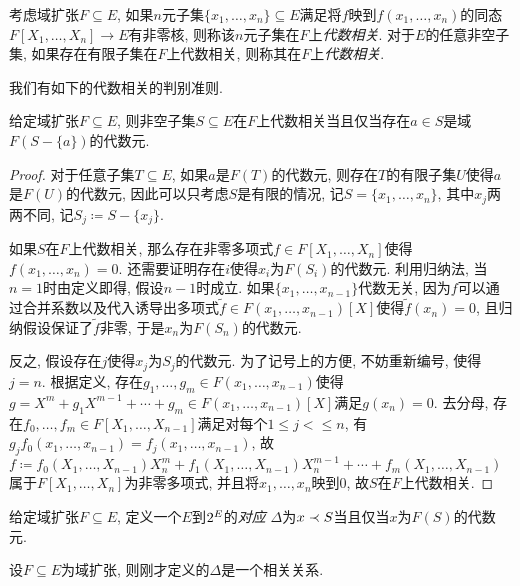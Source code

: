 \begin{definition}
  考虑域扩张$F\subseteq E$, 如果$n$元子集$\{x_1, \dotsc, x_n\}\subseteq E$满足将$f$映到$f(x_1, \dotsc, x_n)$的同态$F[X_1, \dotsc, X_n]\to E$有非零核, 则称该$n$元子集在$F$上\emph{代数相关}. 对于$E$的任意非空子集, 如果存在有限子集在$F$上代数相关, 则称其在$F$上\emph{代数相关}.
\end{definition}

我们有如下的代数相关的判别准则.

\begin{proposition}\label{prop:algbdependcrit}
  给定域扩张$F\subseteq E$, 则非空子集$S\subseteq E$在$F$上代数相关当且仅当存在$a\in S$是域$F(S-\{a\})$的代数元.
\end{proposition}

\begin{proof}
  对于任意子集$T\subseteq E$, 如果$a$是$F(T)$的代数元, 则存在$T$的有限子集$U$使得$a$是$F(U)$的代数元, 因此可以只考虑$S$是有限的情况, 记$S=\{x_1, \dotsc, x_n\}$, 其中$x_j$两两不同, 记$S_j\coloneq S-\{x_j\}$.

  如果$S$在$F$上代数相关, 那么存在非零多项式$f\in F[X_1, \dotsc, X_n]$使得$f(x_1, \dotsc, x_n)=0$. 还需要证明存在$i$使得$x_i$为$F(S_i)$的代数元. 利用归纳法, 当$n=1$时由定义即得, 假设$n-1$时成立. 如果$\{x_1, \dotsc, x_{n-1}\}$代数无关, 因为$f$可以通过合并系数以及代入诱导出多项式$\tilde{f}\in F(x_1, \dotsc, x_{n-1})[X]$使得$\tilde{f}(x_n)=0$, 且归纳假设保证了$\tilde{f}$非零, 于是$x_n$为$F(S_n)$的代数元.

  反之, 假设存在$j$使得$x_j$为$S_j$的代数元. 为了记号上的方便, 不妨重新编号, 使得$j=n$. 根据定义, 存在$g_1, \dotsc, g_m\in F(x_1, \dotsc, x_{n-1})$使得$g=X^m+g_1X^{m-1}+\dotsb+g_m\in F(x_1, \dotsc, x_{n-1})[X]$满足$g(x_n)=0$. 去分母, 存在$f_0, \dotsc, f_m\in F[X_1, \dotsc, X_{n-1}]$满足对每个$1\leq j<\leq n$, 有$g_jf_0(x_1, \dotsc, x_{n-1})=f_j(x_1, \dotsc, x_{n-1})$, 故$f\coloneq f_0(X_1, \dotsc, X_{n-1})X_n^m+f_1(X_1, \dotsc, X_{n-1})X_n^{m-1}+\dotsb+f_m(X_1, \dotsc, X_{n-1})$属于$F[X_1, \dotsc, X_n]$为非零多项式, 并且将$x_1, \dotsc, x_n$映到0, 故$S$在$F$上代数相关.
\end{proof}

给定域扩张$F\subseteq E$, 定义一个$E$到$2^{E}$的\emph{对应} $\Delta$为$x\prec S$当且仅当$x$为$F(S)$的代数元.

\begin{proposition}\label{prop:algbdependcorr}
  设$F\subseteq E$为域扩张, 则刚才定义的$\Delta$是一个相关关系.
\end{proposition}

